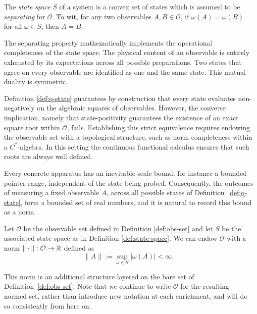 	\begin{definition}\label{def:state-space}
		The \emph{state space} $S$ of a system is a convex set of states which is assumed to be \emph{separating} for $\mathcal{O}$. To wit, for any two observables $A,B\in\mathcal{O}$, if $\omega(A)=\omega(B)$ for all $\omega\in S$, then $A=B$.
	\end{definition}
	
	The separating property mathematically implements the operational completeness of the state space. The physical content of an observable is entirely exhausted by its expectations across all possible preparations. Two states that agree on every observable are identified as one and the same state. This mutual duality is  symmetric.
	\begin{remark}
		Definition \ref{def:q-state} guarantees by construction that every state evaluates non-negatively on the algebraic squares of observables. However, the converse implication, namely that state-positivity guarantees the existence of an exact square root within $\mathcal{O}$, fails. Establishing this strict equivalence requires endowing the observable set with a topological structure, such as norm completeness within a $C^*$-algebra. In this setting the continuous functional calculus ensures that such roots are always well defined.
	\end{remark}

Every concrete apparatus has an inevitable scale bound, for instance a
bounded pointer range, independent of the state being probed. Consequently,
the outcomes of measuring a fixed observable $A$, across all possible
states of Definition~\ref{def:q-state}, form a bounded set of real numbers,
and it is natural to record this bound as a norm.

\begin{definition}\label{def:normed-obs-set}
	Let $\mathcal{O}$  be the observable set defined in Definition \ref{def:obs-set} and let $S$ be the associated state space as in Definition \ref{def:state-space}. We can endow $\mathcal{O}$ with a norm $\| \cdot \| : \mathcal{O} \to \R$ defined as 
	\[
	\|A\| := \sup_{\omega \in S} |\omega(A)| < \infty .
	\]
\end{definition}

This norm is an additional structure layered on the bare set of
Definition~\ref{def:obs-set}. Note that we continue to write $\mathcal{O}$ for the
resulting normed set, rather than introduce new notation at each
enrichment, and will do so consistently from here on. 

